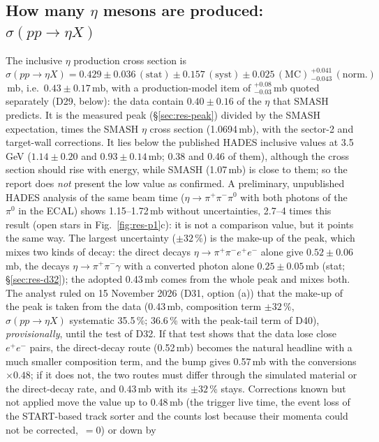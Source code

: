 \documentclass[11pt,a4paper]{article}
\newcommand{\piz}{\ensuremath{\pi^{0}}\xspace}
\newcommand{\ee}{\ensuremath{e^{+}e^{-}}\xspace}
\newcommand{\pipi}{\ensuremath{\pi^{+}\pi^{-}}\xspace}
\newcommand{\ppee}{\ensuremath{\pi^{+}\pi^{-}e^{+}e^{-}}\xspace}
\newcommand{\code}[1]{\texttt{\detokenize{#1}}}
\newcommand{\sigeta}{\ensuremath{\sigma(pp\to\eta X)}\xspace}
\begin{document}
\subsection{How many \texorpdfstring{$\eta$}{eta} mesons are produced: \texorpdfstring{$\sigma(pp\to\eta X)$}{sigma(pp -> eta X)}}
\label{sec:res-sigma}
The inclusive $\eta$ production cross section is
$\sigeta=0.429\pm0.036\,(\mathrm{stat})\pm0.157\,(\mathrm{syst})\pm0.025\,(\mathrm{MC})\,^{+0.041}_{-0.043}\,(\mathrm{norm.})$\,mb, i.e.\
$0.43\pm0.17$\,mb, with a production-model item of $^{+0.08}_{-0.03}$\,mb quoted separately (D29, below): the data contain $0.40\pm0.16$ of
the $\eta$ that SMASH predicts. It is the measured peak (\S\ref{sec:res-peak})
divided by the SMASH expectation, times the SMASH $\eta$ cross section (1.0694\,mb), with the sector-2 and target-wall corrections. It lies below
the published HADES inclusive values at 3.5\,GeV ($1.14\pm0.20$ and $0.93\pm0.14$\,mb; 0.38 and 0.46 of them), although the cross section should
rise with energy, while SMASH (1.07\,mb) is close to them; so the report does \emph{not} present the low value as confirmed. A preliminary,
unpublished HADES analysis of the same beam time ($\eta\to\pipi\piz$ with both photons of the \piz in the ECAL) shows 1.15--1.72\,mb without
uncertainties, 2.7--4 times this result (open stars in Fig.~\ref{fig:res-p1}c): it is not a comparison value, but it points the same way. The
largest uncertainty ($\pm32$\,\%) is the make-up of the peak, which mixes two kinds of decay: the direct
decays $\eta\to\ppee$ alone give $0.52\pm0.06$\,mb, the decays $\eta\to\pipi\gamma$ with a converted photon alone $0.25\pm0.05$\,mb (stat;
\S\ref{sec:res-d32}); the adopted 0.43\,mb comes from the whole peak and mixes both. The analyst ruled on 15 November 2026 (D31,
option (a)) that the make-up of the peak is taken from the data (0.43\,mb, composition term $\pm32$\,\%, \sigeta systematic 35.5\,\%; 36.6\,\% with the peak-tail term of D40),
\emph{provisionally}, until the test of D32. If that test shows that the data lose close \ee pairs, the direct-decay route (0.52\,mb) becomes
the natural headline with a much smaller composition term, and the bump gives 0.57\,mb with the conversions $\times0.48$; if it does not, the
two routes must differ through the simulated material or the direct-decay rate, and 0.43\,mb with its $\pm32$\,\% stays. Corrections known but not applied move the value up to
0.48\,mb (the trigger live time, the event loss of the START-based track sorter and the counts lost because their momenta could not be
corrected, \code{cor_ok}$\,=0$) or down by
\end{document}
